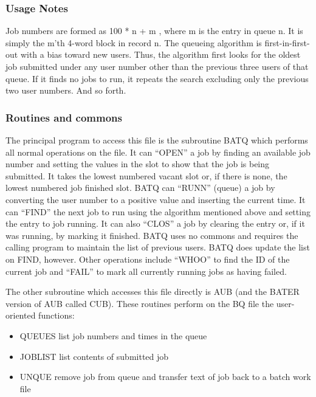 \subsubsection{Usage Notes}


     Job numbers are formed as 100 * n + m , where m is the entry in
queue n.  It is simply the m'th 4-word block in record n.  The queueing
algorithm is first-in-first-out with a bias toward new users.  Thus,
the algorithm first looks for the oldest job submitted under any user
number other than the previous three users of that queue.  If it finds
no jobs to run, it repeats the search excluding only the previous two
user numbers.  And so forth.

\subsubsection{Routines and commons}

     The principal program to access this file is the subroutine BATQ
which performs all normal operations on the file.  It can ``OPEN'' a
job by finding an available job number and setting the values in the
slot to show that the job is being submitted.  It takes the lowest
numbered vacant slot or, if there is none, the lowest numbered job
finished slot.  BATQ can ``RUNN'' (queue) a job by converting the user
number to a positive value and inserting the current time.  It can
``FIND'' the next job to run using the algorithm mentioned above and
setting the entry to job running.  It can also ``CLOS'' a job by
clearing the entry or, if it was running, by marking it finished.
BATQ uses no commons and requires the calling program to maintain the
list of previous users.  BATQ does update the list on FIND, however.
Other operations include ``WHOO'' to find the ID of the current job
and ``FAIL'' to mark all currently running jobs as having failed.

     The other subroutine which accesses this file directly is AUB
(and the BATER version of AUB called CUB).  These routines perform
on the BQ file the user-oriented functions:

\begin{itemize}
\item QUEUES  list job numbers and times in the queue
\item JOBLIST list contents of submitted job
\item UNQUE  remove job from queue and transfer text of job back
to a batch work file
\end{itemize}

